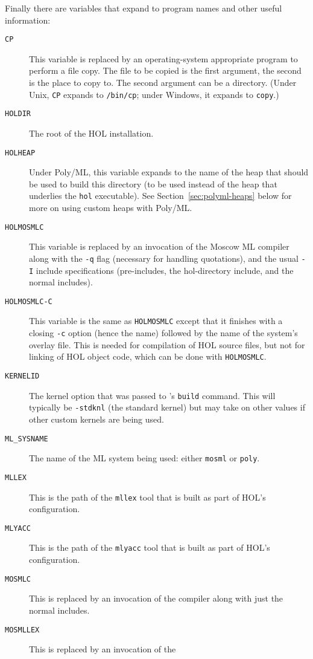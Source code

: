 Finally there are variables that expand to program names and other
useful information:
\begin{description}
\item[\texttt{CP}] This variable is replaced by an operating-system
  appropriate program to perform a file copy.  The file to be copied
  is the first argument, the second is the place to copy to.  The
  second argument can be a directory.  (Under Unix, \texttt{CP}
  expands to \texttt{/bin/cp}; under Windows, it expands to
  \texttt{copy}.)
\item[\texttt{HOLDIR}] The root of the HOL installation.
\item[\texttt{HOLHEAP}]
Under Poly/ML, this variable expands to the name of the heap that should be used to build this directory (to be used instead of the heap that underlies the \texttt{hol} executable).
See Section~\ref{sec:polyml-heaps} below for more on using custom heaps with Poly/ML.
\item[\texttt{HOLMOSMLC}] This variable is replaced by an invocation
  of the Moscow ML compiler along with the \texttt{-q} flag (necessary
  for handling quotations), and the usual \texttt{-I} include
  specifications (pre-includes, the hol-directory include, and the
  normal includes).
\item[\texttt{HOLMOSMLC-C}] This variable is the same as
  \texttt{HOLMOSMLC} except that it finishes with a closing
  \texttt{-c} option (hence the name) followed by the name of the
  system's overlay file.  This is needed for compilation of HOL source
  files, but not for linking of HOL object code, which can be done
  with \texttt{HOLMOSMLC}.
\item[\texttt{KERNELID}]
  The kernel option that was passed to \HOL's \texttt{build} command.
  This will typically be \texttt{-stdknl} (the standard kernel) but may take on other values if other custom kernels are being used.
\item[\texttt{ML\_SYSNAME}] The name of the ML system being used:
  either \texttt{mosml} or \texttt{poly}.
\item[\texttt{MLLEX}] This is the path of the \texttt{mllex} tool that
  is built as part of HOL's configuration.
\item[\texttt{MLYACC}] This is the path of the \texttt{mlyacc} tool that
  is built as part of HOL's configuration.
\item[\texttt{MOSMLC}] This is replaced by an invocation of the
  compiler along with just the normal includes.
\item[\texttt{MOSMLLEX}] This is replaced by an invocation of the

\end{description}
